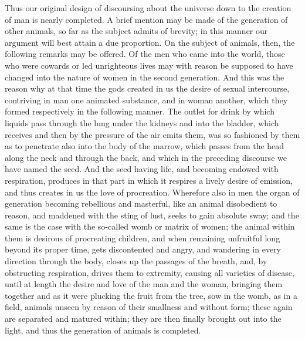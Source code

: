 \documentclass[11pt,letter]{article}
\begin{document}
\par  Thus our original design of discoursing about the universe down to the creation of man is nearly completed. A brief mention may be made of the generation of other animals, so far as the subject admits of brevity; in this manner our argument will best attain a due proportion. On the subject of animals, then, the following remarks may be offered. Of the men who came into the world, those who were cowards or led unrighteous lives may with reason be supposed to have changed into the nature of women in the second generation. And this was the reason why at that time the gods created in us the desire of sexual intercourse, contriving in man one animated substance, and in woman another, which they formed respectively in the following manner. The outlet for drink by which liquids pass through the lung under the kidneys and into the bladder, which receives and then by the pressure of the air emits them, was so fashioned by them as to penetrate also into the body of the marrow, which passes from the head along the neck and through the back, and which in the preceding discourse we have named the seed. And the seed having life, and becoming endowed with respiration, produces in that part in which it respires a lively desire of emission, and thus creates in us the love of procreation. Wherefore also in men the organ of generation becoming rebellious and masterful, like an animal disobedient to reason, and maddened with the sting of lust, seeks to gain absolute sway; and the same is the case with the so-called womb or matrix of women; the animal within them is desirous of procreating children, and when remaining unfruitful long beyond its proper time, gets discontented and angry, and wandering in every direction through the body, closes up the passages of the breath, and, by obstructing respiration, drives them to extremity, causing all varieties of disease, until at length the desire and love of the man and the woman, bringing them together and as it were plucking the fruit from the tree, sow in the womb, as in a field, animals unseen by reason of their smallness and without form; these again are separated and matured within; they are then finally brought out into the light, and thus the generation of animals is completed.
\end{document}
